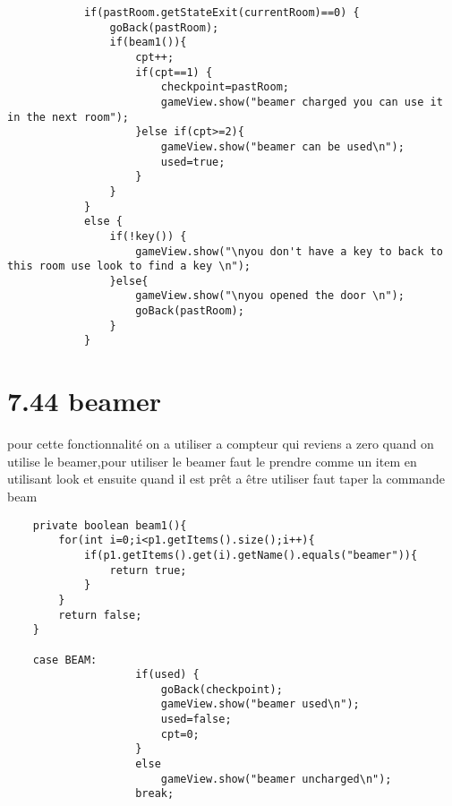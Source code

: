 \documentclass[a4paper , 10pt]{article}
\begin{document}
\begin{verbatim}
            if(pastRoom.getStateExit(currentRoom)==0) {
                goBack(pastRoom);
                if(beam1()){
                    cpt++;
                    if(cpt==1) {
                        checkpoint=pastRoom;
                        gameView.show("beamer charged you can use it in the next room");
                    }else if(cpt>=2){
                        gameView.show("beamer can be used\n");
                        used=true;
                    }
                }
            }
            else {
                if(!key()) {
                    gameView.show("\nyou don't have a key to back to this room use look to find a key \n");
                }else{
                    gameView.show("\nyou opened the door \n");
                    goBack(pastRoom);
                }
            }
\end{verbatim}
\section{7.44 beamer}
pour cette fonctionnalité on a utiliser a compteur qui reviens a zero quand on utilise le beamer,pour utiliser le beamer faut le prendre comme un item en utilisant look et ensuite quand il est prêt a être utiliser faut taper la commande beam
\begin{verbatim}
    private boolean beam1(){
        for(int i=0;i<p1.getItems().size();i++){
            if(p1.getItems().get(i).getName().equals("beamer")){
                return true;
            }
        }
        return false;
    }
    
    case BEAM:
                    if(used) {
                        goBack(checkpoint);
                        gameView.show("beamer used\n");
                        used=false;
                        cpt=0;
                    }
                    else
                        gameView.show("beamer uncharged\n");
                    break;
                
                    
\end{verbatim}
\end{document}
